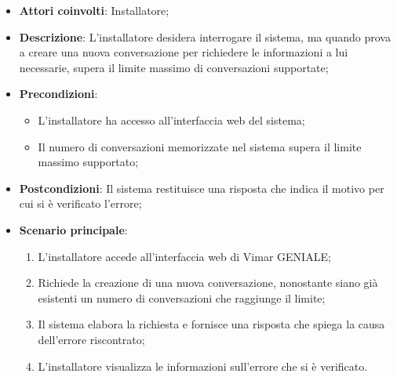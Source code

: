 \begin{itemize}
    \item \textbf{Attori coinvolti}: Installatore;
    \item \textbf{Descrizione}: L’installatore desidera interrogare il sistema, ma quando prova a creare una nuova conversazione per richiedere le informazioni a lui necessarie, supera il limite massimo di conversazioni supportate;
    \item \textbf{Precondizioni}: 
        \begin{itemize}
            \item L’installatore ha accesso all’interfaccia web del sistema;
            \item Il numero di conversazioni memorizzate nel sistema supera il limite massimo supportato;
        \end{itemize}
    \item \textbf{Postcondizioni}:  Il sistema restituisce una risposta che indica il motivo per cui si è verificato l’errore;
    \item \textbf{Scenario principale}:
    \begin{enumerate}
    \item L’installatore accede all’interfaccia web di Vimar GENIALE;
    \item Richiede la creazione di una nuova conversazione, nonostante siano già esistenti un numero di conversazioni che raggiunge il limite;
    \item Il sistema elabora la richiesta e fornisce una risposta che spiega la causa dell'errore riscontrato;
    \item L’installatore visualizza le informazioni sull’errore che si è verificato.
    \end{enumerate}
\end{itemize}

